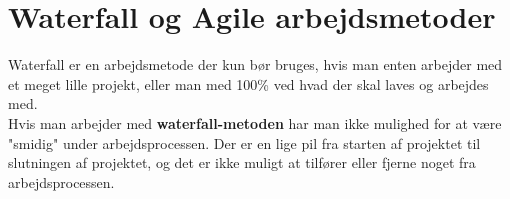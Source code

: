 \section{Waterfall og Agile arbejdsmetoder}

\begin{tcolorbox}[colback=red!10!white,colframe=red!75!black,title=\enumlemma{Waterfall} ]
Waterfall er en arbejdsmetode der kun bør bruges, hvis man enten arbejder med et meget lille projekt, eller man med 100\% ved hvad der skal laves og arbejdes med.\\
Hvis man arbejder med \textbf{waterfall-metoden} har man ikke mulighed for at være "smidig" under arbejdsprocessen. Der er en lige pil fra starten af projektet til slutningen af projektet, og det er ikke muligt at tilfører eller fjerne noget fra arbejdsprocessen. 
\end{tcolorbox}\\